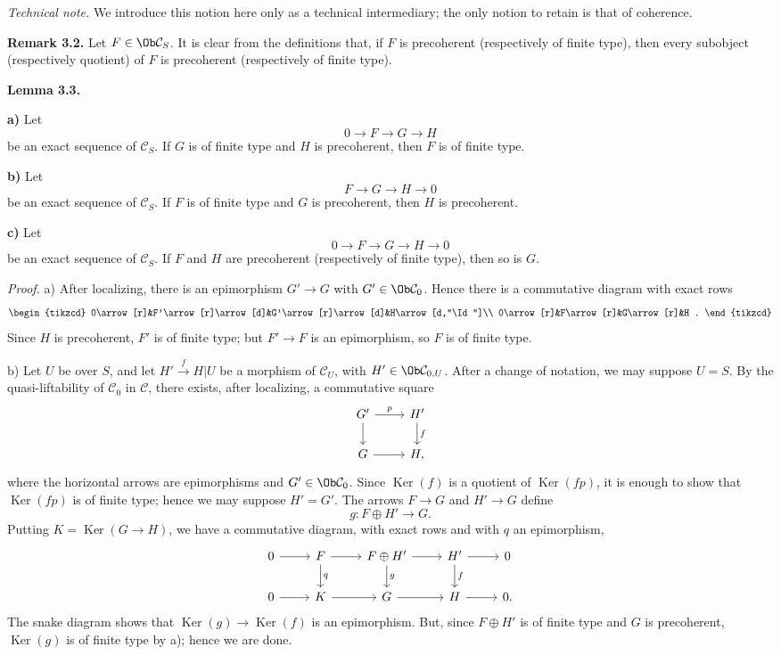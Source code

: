 \documentclass[11pt]{article}
\providecommand{\Ker}{\operatorname{Ker}}
\begin{document}
\emph{Technical note.} We introduce this notion here only as a technical intermediary; the only notion to retain is that of coherence.

\textbf{Remark 3.2.} Let \(F\in\Ob\mathcal C_S\). It is clear from the definitions that, if \(F\) is precoherent (respectively of finite type), then every subobject (respectively quotient) of \(F\) is precoherent (respectively of finite type).

\textbf{Lemma 3.3.}

\textbf{a)} Let
\[
  0\longrightarrow F\longrightarrow G\longrightarrow H
\]
be an exact sequence of \(\mathcal C_S\). If \(G\) is of finite type and \(H\) is precoherent, then \(F\) is of finite type.

\textbf{b)} Let
\[
  F\longrightarrow G\longrightarrow H\longrightarrow 0
\]
be an exact sequence of \(\mathcal C_S\). If \(F\) is of finite type and \(G\) is precoherent, then \(H\) is precoherent.

\textbf{c)} Let
\[
  0\longrightarrow F\longrightarrow G\longrightarrow H\longrightarrow 0
\]
be an exact sequence of \(\mathcal C_S\). If \(F\) and \(H\) are precoherent (respectively of finite type), then so is \(G\).

\emph{Proof.} a) After localizing, there is an epimorphism \(G'\to G\) with \(G'\in\Ob\mathcal C_0\). Hence there is a commutative diagram with exact rows
\[
\begin{tikzcd}
0\arrow[r]&F'\arrow[r]\arrow[d]&G'\arrow[r]\arrow[d]&H\arrow[d,"\Id"]\\
0\arrow[r]&F\arrow[r]&G\arrow[r]&H .
\end{tikzcd}
\]
Since \(H\) is precoherent, \(F'\) is of finite type; but \(F'\to F\) is an epimorphism, so \(F\) is of finite type.

b) Let \(U\) be over \(S\), and let \(H'\xrightarrow{f}H|U\) be a morphism of \(\mathcal C_U\), with \(H'\in\Ob\mathcal C_{0,U}\). After a change of notation, we may suppose \(U=S\). By the quasi-liftability of \(\mathcal C_0\) in \(\mathcal C\), there exists, after localizing, a commutative square
\[
\begin{tikzcd}
G' \arrow[r,"p"] \arrow[d] & H' \arrow[d,"f"]\\
G \arrow[r] & H,
\end{tikzcd}
\]
where the horizontal arrows are epimorphisms and \(G'\in\Ob\mathcal C_0\). Since \(\Ker(f)\) is a quotient of \(\Ker(fp)\), it is enough to show that \(\Ker(fp)\) is of finite type; hence we may suppose \(H'=G'\). The arrows \(F\to G\) and \(H'\to G\) define
\[
  g:F\oplus H'\longrightarrow G.
\]
Putting \(K=\Ker(G\to H)\), we have a commutative diagram, with exact rows and with \(q\) an epimorphism,
\[
\begin{tikzcd}
0\arrow[r]&F\arrow[r]\arrow[d,"q"]&F\oplus H'\arrow[r]\arrow[d,"g"]&H'\arrow[r]\arrow[d,"f"]&0\\
0\arrow[r]&K\arrow[r]&G\arrow[r]&H\arrow[r]&0 .
\end{tikzcd}
\]
The snake diagram shows that \(\Ker(g)\to\Ker(f)\) is an epimorphism. But, since \(F\oplus H'\) is of finite type and \(G\) is precoherent, \(\Ker(g)\) is of finite type by a); hence we are done.
\end{document}
